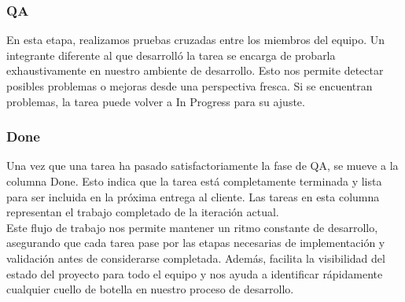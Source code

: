 \subsubsection{QA}
En esta etapa, realizamos pruebas cruzadas entre los miembros del equipo. Un integrante diferente al que desarrolló la tarea se encarga de probarla 
exhaustivamente en nuestro ambiente de desarrollo. Esto nos permite detectar posibles problemas o mejoras desde una perspectiva fresca. Si se 
encuentran problemas, la tarea puede volver a In Progress para su ajuste.

\subsubsection{Done}
Una vez que una tarea ha pasado satisfactoriamente la fase de QA, se mueve a la columna Done. Esto indica que la tarea está completamente terminada 
y lista para ser incluida en la próxima entrega al cliente. Las tareas en esta columna representan el trabajo completado de la iteración actual.\\
Este flujo de trabajo nos permite mantener un ritmo constante de desarrollo, asegurando que cada tarea pase por las etapas necesarias de implementación 
y validación antes de considerarse completada. Además, facilita la visibilidad del estado del proyecto para todo el equipo y nos ayuda a identificar 
rápidamente cualquier cuello de botella en nuestro proceso de desarrollo.
